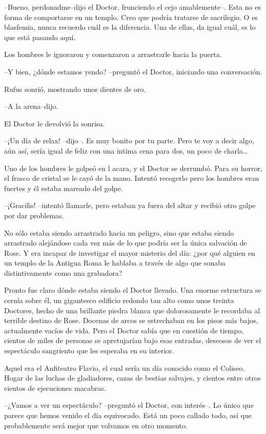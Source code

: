 --Bueno, perdonadme--dijo el Doctor, frunciendo el cejo amablemente--.
Esta no es forma de comportarse en un templo. Creo que podría tratarse
de sacrilegio. O es blasfemia, nunca recuerdo cuál es la diferencia. Una
de ellas, da igual cuál, es lo que está pasando aquí.

Los hombres le ignoraron y comenzaron a arrastrarle hacia la puerta.

--Y bien, ¿dónde estamos yendo? --preguntó el Doctor, iniciando una
conversación.

Rufus sonrió, mostrando unos dientes de oro.

--A la arena--dijo.

El Doctor le devolvió la sonrisa.

--¡Un día de relax! --dijo--. Es muy bonito por tu parte. Pero te voy a
decir algo, aún así, sería igual de feliz con una intima cena para dos,
un poco de charla\ldots{}

Uno de los hombres le golpeó en l acara, y el Doctor se derrumbó. Para
su horror, el frasco de cristal se le cayó de la mano. Intentó recogerlo
pero los hombres eran fuertes y él estaba mareado del golpe.

--¡Gracilis! --intentó llamarle, pero estaban ya fuera del altar y
recibió otro golpe por dar problemas.

No sólo estaba siendo arrastrado hacia un peligro, sino que estaba
siendo arrastrado alejándose cada vez más de lo que podría ser la única
salvación de Rose. Y era incapaz de investigar el mayor misterio del
día: ¿por qué alguien en un templo de la Antigua Roma le hablaba a
través de algo que sonaba distintivamente como una grabadora?

Pronto fue claro dónde estaba siendo el Doctor llevado. Una enorme
estructura se cernía sobre él, un gigantesco edificio redondo tan alto
como unos treinta Doctores, hecho de una brillante piedra blanca que
dolorosamente le recordaba al terrible destino de Rose. Docenas de arcos
se estrechaban en los pisos más bajos, actualmente vacíos de vida. Pero
el Doctor sabía que en cuestión de tiempo, cientos de miles de personas
se apretujarían bajo esas entradas, deseosos de ver el espectáculo
sangriento que les esperaba en su interior.

Aquel era el Anfiteatro Flavio, el cual sería un día conocido como el
Coliseo. Hogar de las luchas de gladiadores, cazas de bestias salvajes,
y cientos entre otros cientos de ejecuciones macabras.

--¿Vamos a ver un espectáculo? --preguntó el Doctor, con interés--. Lo
único que parece que hemos venido el día equivocado. Está un poco
callado todo, así que probablemente será mejor que volvamos en otro
momento.

